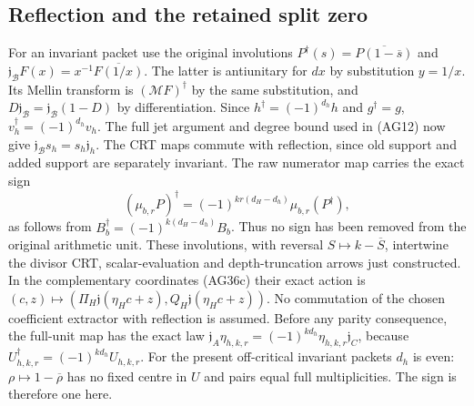 \subsection{Reflection and the retained split zero}

For an invariant packet use the original involutions
$P^\dagger(s)=\overline{P(1-\overline s)}$ and
$\mathfrak j_{\mathscr B}F(x)=x^{-1}\overline{F(1/x)}$.
The latter is antiunitary for $dx$ by substitution $y=1/x$.
Its Mellin transform is $(\mathcal MF)^\dagger$ by the same
substitution, and $D\mathfrak j_{\mathscr B}=
\mathfrak j_{\mathscr B}(1-D)$ by differentiation.
Since $h^\dagger=(-1)^{d_h}h$ and $g^\dagger=g$,
$v_h^\dagger=(-1)^{d_h}v_h$.  The full jet argument and degree
bound used in (AG12) now give
$\mathfrak j_{\mathscr B}s_h=s_h\mathfrak j_h$.
The CRT maps commute with reflection, since old support and added
support are separately invariant.  The raw numerator map carries
the exact sign
\[
 (\mu_{b,r}P)^\dagger
       =(-1)^{kr(d_H-d_h)}\mu_{b,r}(P^\dagger),
 \tag{AG37}
\]
as follows from $B_b^\dagger=(-1)^{k(d_H-d_h)}B_b$.
Thus no sign has been removed from the original arithmetic unit.
These involutions, with reversal $S\mapsto k-\overline S$,
intertwine the divisor CRT, scalar-evaluation and depth-truncation
arrows just constructed.  In the complementary coordinates (AG36c)
their exact action is
$(c,z)\mapsto(\Pi_H\mathfrak j(\eta_Hc+z),
Q_H\mathfrak j(\eta_Hc+z))$.
No commutation of the chosen coefficient extractor with reflection
is assumed.
Before any parity consequence, the full-unit map has the exact law
$\mathfrak j_A\eta_{h,k,r}=(-1)^{kd_h}\eta_{h,k,r}\mathfrak j_C$,
because $U_{h,k,r}^\dagger=(-1)^{kd_h}U_{h,k,r}$.
For the present off-critical invariant packets $d_h$ is even:
$\rho\mapsto1-\overline\rho$ has no fixed centre in $U$ and
pairs equal full multiplicities.  The sign is therefore one here.

